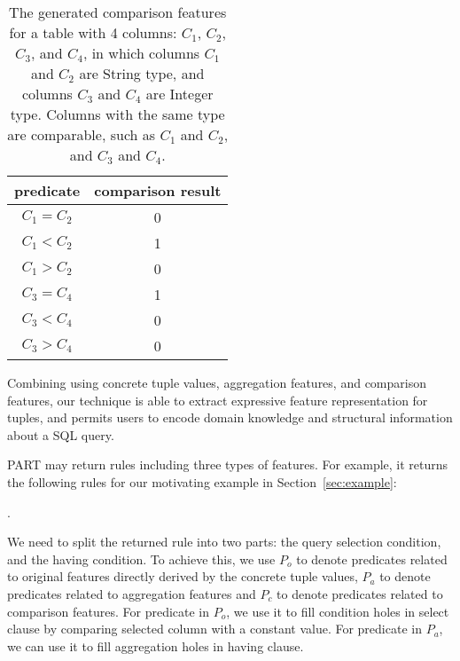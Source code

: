 \begin{table}[t]
	\begin{center}
		\begin{tabular}{|c|c|}
		\hline
		\textbf{predicate}	& \textbf{comparison result} \\
		\hline
		$C_1=C_2$ 			& 0\\
		$C_1<C_2$ 			& 1\\
		$C_1>C_2$			& 0\\
		\hline
		$C_3=C_4$ 			& 1\\
		$C_3<C_4$ 			& 0\\
		$C_3>C_4$			& 0\\
		\hline
		\end{tabular}
	\end{center}
	\caption{The generated comparison features
for a table with 4 columns: $C_1$, $C_2$, $C_3$,
and $C_4$, in which columns $C_1$ and $C_2$ are \textsf{String} type, and
columns $C_3$ and $C_4$ are \textsf{Integer} type. Columns with
the same type are comparable, such as $C_1$ and $C_2$, and
$C_3$ and $C_4$.
}
	\label{tbl:com}
\end{table}

Combining using concrete tuple values, aggregation
features, and comparison features, our technique is able to
extract expressive feature representation for tuples,
and permits users to encode domain knowledge and structural
information about a SQL query.

\vspace{1mm}
PART may return rules including three types of features. For example,
it returns the following rules for our motivating example in Section~\ref{sec:example}:

\smallskip
{
    .
}
\vspace{-2mm}

We need to split the returned rule into two parts: the query selection
condition, and the having condition. To achieve this, we
use $P_o$ to denote predicates related to original features
directly derived by the concrete tuple values,
$P_a$ to denote predicates related to aggregation features and $P_c$ to
denote predicates related to comparison features. For predicate in $P_o$,
we use it to fill condition holes in select clause by comparing selected
column with a constant value. For predicate in $P_a$, we
can use it to fill aggregation holes in having clause.

